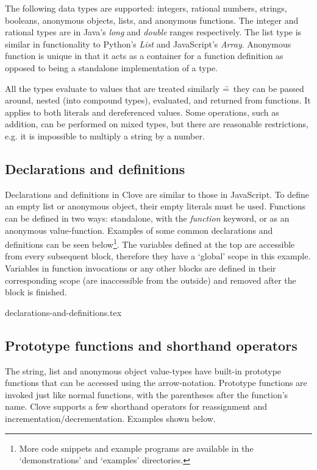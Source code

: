 \documentclass[12pt,a4paper]{article}
\begin{document}
The following data types are supported: integers, rational numbers, strings, booleans, anonymous objects, lists, and anonymous functions. The integer and rational types are in Java's \emph{long} and \emph{double} ranges respectively. The list type is similar in functionality to Python's \emph{List} and JavaScript's \emph{Array}. Anonymous function is unique in that it acts as a container for a function definition as opposed to being a standalone implementation of a type.\par

All the types evaluate to values that are treated similarly \==~they can be passed around, nested (into compound types), evaluated, and returned from functions. It applies to both literals and dereferenced values. Some operations, such as addition, can be performed on mixed types, but there are reasonable restrictions, e.g. it is impossible to multiply a string by a number.



\subsection*{Declarations and definitions}
Declarations and definitions in Clove are similar to those in JavaScript. To define an empty list or anonymous object, their empty literals must be used. Functions can be defined in two ways: standalone, with the \emph{function} keyword, or as an anonymous value-function. Examples of some common declarations and definitions can be seen below\footnote{More code snippets and example programs are available in the `demonstrations' and `examples' directories.}. The variables defined at the top are accessible from every subsequent block, therefore they have a `global' scope in this example. Variables in function invocations or any other blocks are defined in their corresponding scope (are inaccessible from the outside) and removed after the block is finished.

{declarations-and-definitions.tex}



\subsection*{Prototype functions and shorthand operators}
The string, list and anonymous object value-types have built-in prototype functions that can be accessed using the arrow-notation. Prototype functions are invoked just like normal functions, with the parentheses after the function's name. Clove supports a few shorthand operators for reassignment and incrementation/decrementation. Examples shown below.
\end{document}
